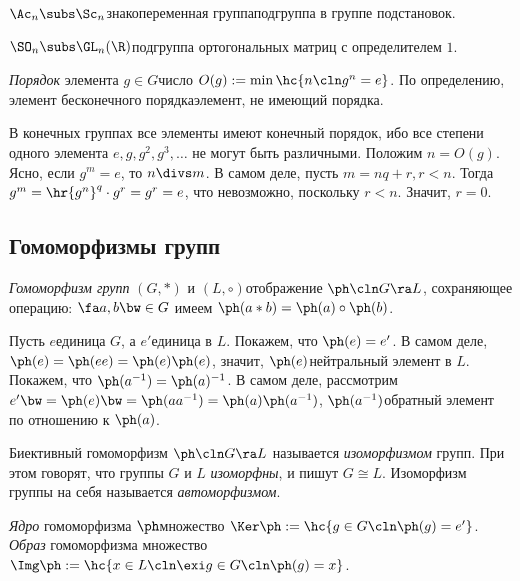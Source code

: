 \documentclass[a4paper]{article}
\newcommand{\kph}{\Ker \ph}
\begin{document}
\begin{ex}

 $\Ac_n \subs \Sc_n$\т знакопеременная группа\т подгруппа в группе подстановок.

 $\SO_n \subs \GL_n(\R)$\т подгруппа ортогональных матриц с определителем $1$.
\end{ex}

\begin{df}
\emph{Порядок} элемента $g \in G$\т число $O(g) := \min \hc{n\cln g^n=e}$. По определению, элемент бесконечного
порядка\т элемент, не имеющий порядка.
\end{df}

В конечных группах все элементы имеют конечный порядок, ибо все степени одного элемента
$e, g, g^2, g^3, \dots$ не могут быть различными. Положим $n = O(g)$. Ясно, если $g^m=e$, то
$n \divs m$. В самом деле, пусть $m=nq+r, r < n$. Тогда $g^m=\hr{g^n}^q\cdot g^r=g^r=e$, что невозможно,
поскольку $r < n$. Значит, $r=0$.

\subsection{Гомоморфизмы групп}

\begin{df}
\emph{Гомоморфизм групп} $(G,*)$ и $(L,\circ)$\т отображение $\ph\cln G \ra L$, сохраняющее операцию: $\fa
a,b\bw\in G$ имеем $\ph(a*b)=\ph(a)\circ\ph(b)$.
\end{df}

Пусть $e$\т единица $G$, а $e'$\т единица в $L$. Покажем, что $\ph(e)=e'$. В самом деле,
$\ph(e)=\ph(ee)=\ph(e)\ph(e)$, значит,
$\ph(e)$\т нейтральный элемент в $L$. Покажем, что $\ph(a^{-1})= \ph(a)^{-1}$. В самом деле, рассмотрим
$e'\bw=\ph(e)\bw=\ph(aa^{-1})=\ph(a)\ph(a^{-1})$,  $\ph(a^{-1})$\т обратный элемент по отношению к $\ph(a)$.

\begin{df}
Биективный гомоморфизм $\ph\cln G \ra L$ называется \emph{изоморфизмом} групп. При этом говорят, что группы
$G$ и $L$ \emph{изоморфны}, и пишут $G \cong L$. Изоморфизм группы на себя называется \emph{автоморфизмом}.
\end{df}

\begin{df}
\emph{Ядро} гомоморфизма $\ph$\т множество $\kph := \hc{g \in G\cln \ph(g)=e'}$. \emph{Образ} гомоморфизма\т
множество $\Img \ph := \hc{x \in L\cln \exi g \in G\cln \ph(g)=x}$.
\end{df}
\end{document}
